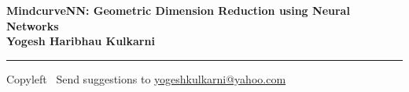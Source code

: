 
\graphicspath{{images/}}

\footnotesize


\begin{center}
\Large{\textbf{MindcurveNN: Geometric Dimension Reduction using Neural Networks\\ Yogesh Haribhau Kulkarni}}  
\end{center}

\begin{multicols}{2}

\end{multicols}

\rule{\linewidth}{0.25pt}
\scriptsize
Copyleft \textcopyleft\  Send suggestions to 
\href{http://www.yogeshkulkarni.com}{yogeshkulkarni@yahoo.com}


